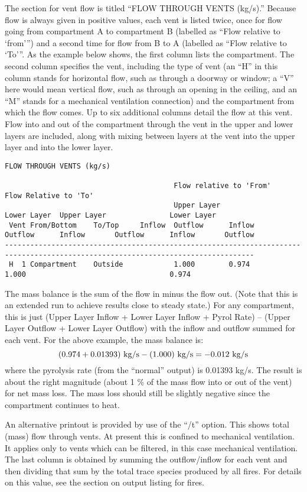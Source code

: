 The section for vent flow is titled ``FLOW THROUGH VENTS (kg/s).''  Because flow is always given in positive values, each vent is listed twice, once for flow going from compartment A to compartment B (labelled as ``Flow relative to `from''') and a second time for flow from B to A (labelled as ``Flow relative to `To'''.  As the example below shows, the first column lists the compartment.  The second column specifies the vent, including the type of vent (an ``H'' in this column stands for horizontal flow, such as through a doorway or window; a ``V'' here would mean vertical flow, such as through an opening in the ceiling, and an ``M'' stands for a mechanical ventilation connection) and the compartment from which the flow comes. Up to six additional columns detail the flow at this vent. Flow into and out of the compartment through the vent in the upper and lower layers are included, along with mixing between layers at the vent into the upper layer and into the lower layer.

\begin{lstlisting}[basicstyle=\tiny]
 FLOW THROUGH VENTS (kg/s)

                                        Flow relative to 'From'                Flow Relative to 'To'
                                        Upper Layer               Lower Layer  Upper Layer               Lower Layer
 Vent From/Bottom    To/Top     Inflow  Outflow      Inflow       Outflow      Inflow       Outflow      Inflow       Outflow
---------------------------------------------------------------------------------------------------------------------------------
 H  1 Compartment    Outside            1.000        0.974                     1.000                                  0.974
\end{lstlisting}
The mass balance is the sum of the flow in minus the flow out. (Note that this is an extended run to achieve results close to steady state.) For any compartment, this is just (Upper Layer Inflow + Lower Layer Inflow + Pyrol Rate) – (Upper Layer Outflow + Lower Layer Outflow) with the inflow and outflow summed for each vent. For the above example, the mass balance is:
$$(0.974 + 0.01393)~\hbox{kg/s} - (1.000)~\hbox{kg/s} = -0.012~\hbox{kg/s}$$
where the pyrolysis rate (from the ``normal'' output) is 0.01393 kg/s. The result is about the right magnitude (about 1 \% of the mass flow into or out of the vent) for net mass loss.  The mass loss should still be slightly negative since the compartment continues to heat.

An alternative printout is provided by use of the ``/t'' option. This shows total (mass) flow through vents. At present this is confined to mechanical ventilation. It applies only to vents which can be filtered, in this case mechanical ventilation. The last column is obtained by summing the outflow/inflow for each vent and then dividing that sum by the total trace species produced by all fires. For details on this value, see the section on output listing for fires.

